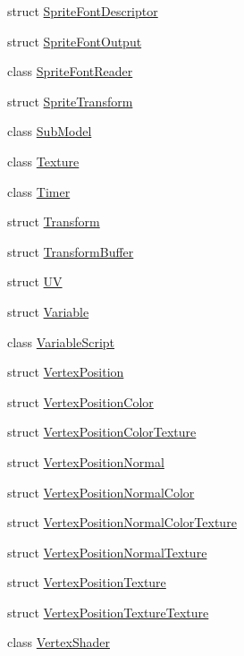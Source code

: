 \begin{DoxyCompactItemize}
\item 
struct \hyperlink{structmage_1_1_sprite_font_descriptor}{Sprite\+Font\+Descriptor}
\item 
struct \hyperlink{structmage_1_1_sprite_font_output}{Sprite\+Font\+Output}
\item 
class \hyperlink{classmage_1_1_sprite_font_reader}{Sprite\+Font\+Reader}
\item 
struct \hyperlink{structmage_1_1_sprite_transform}{Sprite\+Transform}
\item 
class \hyperlink{classmage_1_1_sub_model}{Sub\+Model}
\item 
class \hyperlink{classmage_1_1_texture}{Texture}
\item 
class \hyperlink{classmage_1_1_timer}{Timer}
\item 
struct \hyperlink{structmage_1_1_transform}{Transform}
\item 
struct \hyperlink{structmage_1_1_transform_buffer}{Transform\+Buffer}
\item 
struct \hyperlink{structmage_1_1_u_v}{UV}
\item 
struct \hyperlink{structmage_1_1_variable}{Variable}
\item 
class \hyperlink{classmage_1_1_variable_script}{Variable\+Script}
\item 
struct \hyperlink{structmage_1_1_vertex_position}{Vertex\+Position}
\item 
struct \hyperlink{structmage_1_1_vertex_position_color}{Vertex\+Position\+Color}
\item 
struct \hyperlink{structmage_1_1_vertex_position_color_texture}{Vertex\+Position\+Color\+Texture}
\item 
struct \hyperlink{structmage_1_1_vertex_position_normal}{Vertex\+Position\+Normal}
\item 
struct \hyperlink{structmage_1_1_vertex_position_normal_color}{Vertex\+Position\+Normal\+Color}
\item 
struct \hyperlink{structmage_1_1_vertex_position_normal_color_texture}{Vertex\+Position\+Normal\+Color\+Texture}
\item 
struct \hyperlink{structmage_1_1_vertex_position_normal_texture}{Vertex\+Position\+Normal\+Texture}
\item 
struct \hyperlink{structmage_1_1_vertex_position_texture}{Vertex\+Position\+Texture}
\item 
struct \hyperlink{structmage_1_1_vertex_position_texture_texture}{Vertex\+Position\+Texture\+Texture}
\item 
class \hyperlink{classmage_1_1_vertex_shader}{Vertex\+Shader}

\end{DoxyCompactItemize}
